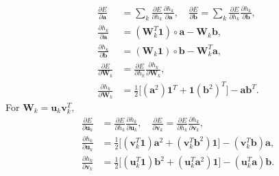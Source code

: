 \documentclass[conference]{IEEEtran}
\begin{document}
\begin{align}
\frac{\partial E}{\partial \mathbf{a}} 
&= \sum_k\frac{\partial E}{\partial h_k}\frac{\partial h_k}{\partial \mathbf{a}}, \quad
\frac{\partial E}{\partial \mathbf{b}} 
= \sum_k\frac{\partial E}{\partial h_k}\frac{\partial h_k}{\partial \mathbf{b}}, \\
\frac{\partial h_k}{\partial \mathbf{a}}
&= (\mathbf{W}_k^T\mathbf{1})\circ\mathbf{a}  -  \mathbf{W}_k \mathbf{b}, \\
\frac{\partial h_k}{\partial \mathbf{b}}
&= (\mathbf{W}_k\mathbf{1})\circ\mathbf{b}  -  \mathbf{W}_k^T \mathbf{a},  \\
\frac{\partial E}{\partial \mathbf{W}_k} 
&= \frac{\partial E}{\partial h_k}\frac{\partial h_k}{\partial \mathbf{W}_k}, \\
\frac{\partial h_k}{\partial \mathbf{W}_k}
&= \frac{1}{2}\Big[(\mathbf{a}^2)\mathbf{1}^T + \mathbf{1}(\mathbf{b}^2)^T\Big]  - \mathbf{a} \mathbf{b}^T.  
\end{align}
For $\mathbf{W}_k = \mathbf{u}_k\mathbf{v}_k^T,$
\begin{align}
\frac{\partial E}{\partial \mathbf{u}_k} 
&= \frac{\partial E}{\partial h_k}\frac{\partial h_k}{\partial \mathbf{u}_k}, \quad \frac{\partial E}{\partial \mathbf{v}_k} 
= \frac{\partial E}{\partial h_k}\frac{\partial h_k}{\partial \mathbf{v}_k}, \\
\frac{\partial h_k}{\partial \mathbf{u}_k}
&= \frac{1}{2}\Big[(\mathbf{v}_k^T\mathbf{1})\mathbf{a}^2  +  (\mathbf{v}^T_k\mathbf{b}^2)\mathbf{1}\Big] - (\mathbf{v}^T_k \mathbf{b})\mathbf{a}, \\
\frac{\partial h_k}{\partial \mathbf{v}_k}
&= \frac{1}{2}\Big[(\mathbf{u}_k^T\mathbf{1})\mathbf{b}^2 + (\mathbf{u}^T_k\mathbf{a}^2)\mathbf{1} \Big] - ( \mathbf{u}_k^T\mathbf{a})\mathbf{b}.
\end{align}




\end{document}
